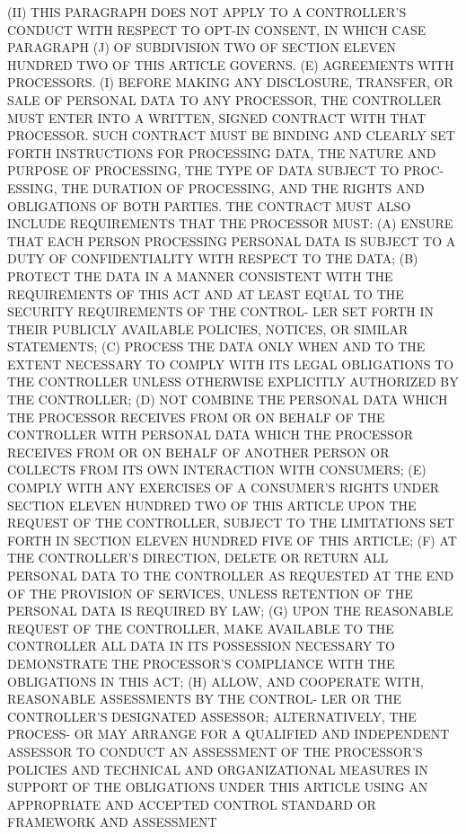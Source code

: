    (II) THIS PARAGRAPH DOES NOT APPLY  TO  A  CONTROLLER'S  CONDUCT  WITH
 RESPECT  TO  OPT-IN  CONSENT, IN WHICH CASE PARAGRAPH (J) OF SUBDIVISION
 TWO OF SECTION ELEVEN HUNDRED TWO OF THIS ARTICLE GOVERNS.
   (E)  AGREEMENTS  WITH  PROCESSORS.  (I)  BEFORE MAKING ANY DISCLOSURE,
 TRANSFER, OR SALE OF PERSONAL DATA TO ANY PROCESSOR, THE CONTROLLER MUST
 ENTER INTO A WRITTEN, SIGNED CONTRACT WITH THAT PROCESSOR. SUCH CONTRACT
 MUST BE BINDING AND CLEARLY SET FORTH INSTRUCTIONS FOR PROCESSING  DATA,
 THE  NATURE AND PURPOSE OF PROCESSING, THE TYPE OF DATA SUBJECT TO PROC-
 ESSING, THE DURATION OF PROCESSING, AND THE RIGHTS  AND  OBLIGATIONS  OF
 BOTH  PARTIES.  THE  CONTRACT  MUST  ALSO  INCLUDE REQUIREMENTS THAT THE
 PROCESSOR MUST:
   (A) ENSURE THAT EACH PERSON PROCESSING PERSONAL DATA IS SUBJECT  TO  A
 DUTY OF CONFIDENTIALITY WITH RESPECT TO THE DATA;
   (B)  PROTECT  THE DATA IN A MANNER CONSISTENT WITH THE REQUIREMENTS OF
 THIS ACT AND AT LEAST EQUAL TO THE SECURITY REQUIREMENTS OF THE CONTROL-
 LER SET FORTH IN THEIR PUBLICLY AVAILABLE POLICIES, NOTICES, OR  SIMILAR
 STATEMENTS;
   (C)  PROCESS  THE DATA ONLY WHEN AND TO THE EXTENT NECESSARY TO COMPLY
 WITH ITS LEGAL OBLIGATIONS TO THE CONTROLLER UNLESS OTHERWISE EXPLICITLY
 AUTHORIZED BY THE CONTROLLER;
   (D) NOT COMBINE THE PERSONAL DATA WHICH THE PROCESSOR RECEIVES FROM OR
 ON BEHALF OF THE CONTROLLER  WITH  PERSONAL  DATA  WHICH  THE  PROCESSOR
 RECEIVES  FROM  OR  ON BEHALF OF ANOTHER PERSON OR COLLECTS FROM ITS OWN
 INTERACTION WITH CONSUMERS;
   (E) COMPLY WITH ANY EXERCISES OF A  CONSUMER'S  RIGHTS  UNDER  SECTION
 ELEVEN  HUNDRED  TWO OF THIS ARTICLE UPON THE REQUEST OF THE CONTROLLER,
 SUBJECT TO THE LIMITATIONS SET FORTH IN SECTION ELEVEN HUNDRED  FIVE  OF
 THIS ARTICLE;
   (F)  AT THE CONTROLLER'S DIRECTION, DELETE OR RETURN ALL PERSONAL DATA
 TO THE CONTROLLER AS REQUESTED AT THE END OF THE PROVISION OF  SERVICES,
 UNLESS RETENTION OF THE PERSONAL DATA IS REQUIRED BY LAW;
   (G)  UPON  THE REASONABLE REQUEST OF THE CONTROLLER, MAKE AVAILABLE TO
 THE CONTROLLER ALL DATA IN ITS POSSESSION NECESSARY TO  DEMONSTRATE  THE
 PROCESSOR'S COMPLIANCE WITH THE OBLIGATIONS IN THIS ACT;
   (H)  ALLOW, AND COOPERATE WITH, REASONABLE ASSESSMENTS BY THE CONTROL-
 LER OR THE CONTROLLER'S DESIGNATED ASSESSOR; ALTERNATIVELY, THE PROCESS-
 OR MAY ARRANGE FOR A QUALIFIED AND INDEPENDENT ASSESSOR  TO  CONDUCT  AN
 ASSESSMENT  OF THE PROCESSOR'S POLICIES AND TECHNICAL AND ORGANIZATIONAL
 MEASURES IN SUPPORT OF THE  OBLIGATIONS  UNDER  THIS  ARTICLE  USING  AN
 APPROPRIATE  AND  ACCEPTED  CONTROL STANDARD OR FRAMEWORK AND ASSESSMENT
